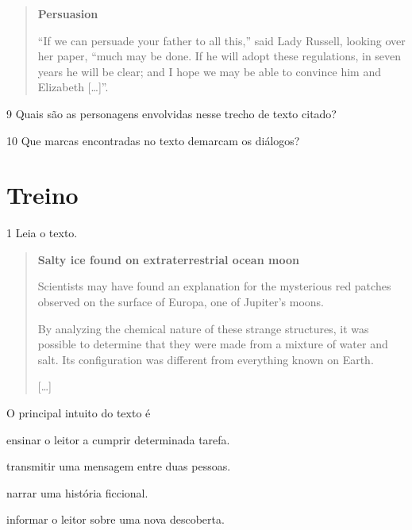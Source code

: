 \begin{quote}
\textbf{Persuasion}

``If we can persuade your father to all this,'' said Lady Russell,
looking over her paper, ``much may be done. If he will adopt these
regulations, in seven years he will be clear; and I hope we may be able
to convince him and Elizabeth {[}\ldots{}{]}''.

\end{quote}

\num{9} Quais são as personagens envolvidas nesse trecho de texto citado?



\num{10} Que marcas encontradas no texto demarcam os diálogos?



\section{Treino}

\num{1} Leia o texto.

\begin{quote}
\textbf{Salty ice found on extraterrestrial ocean moon}

Scientists may have found an explanation for the mysterious red patches observed on the surface of Europa, one of Jupiter’s moons.

By analyzing the chemical nature of these strange structures, it was possible to determine that they were made from a mixture of water and salt. Its configuration was different from everything known on Earth.

{[}\ldots{}{]}

\end{quote}


O principal intuito do texto é

\begin{escolha}
\item ensinar o leitor a cumprir determinada tarefa.

\item transmitir uma mensagem entre duas pessoas.

\item narrar uma história ficcional.

\item informar o leitor sobre uma nova descoberta.
\end{escolha}

